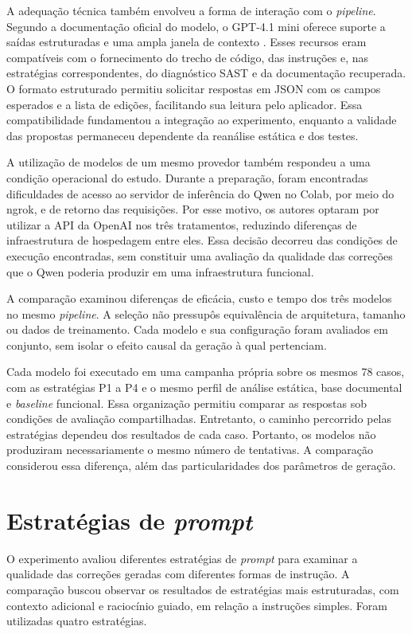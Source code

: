 A adequação técnica também envolveu a forma de interação com o \textit{pipeline}. Segundo a documentação oficial do modelo, o GPT-4.1 mini oferece suporte a saídas estruturadas e uma ampla janela de contexto \cite{openai_gpt41mini}. Esses recursos eram compatíveis com o fornecimento do trecho de código, das instruções e, nas estratégias correspondentes, do diagnóstico SAST e da documentação recuperada. O formato estruturado permitiu solicitar respostas em JSON com os campos esperados e a lista de edições, facilitando sua leitura pelo aplicador. Essa compatibilidade fundamentou a integração ao experimento, enquanto a validade das propostas permaneceu dependente da reanálise estática e dos testes.

A utilização de modelos de um mesmo provedor também respondeu a uma condição operacional do estudo. Durante a preparação, foram encontradas dificuldades de acesso ao servidor de inferência do Qwen no Colab, por meio do ngrok, e de retorno das requisições. Por esse motivo, os autores optaram por utilizar a API da OpenAI nos três tratamentos, reduzindo diferenças de infraestrutura de hospedagem entre eles. Essa decisão decorreu das condições de execução encontradas, sem constituir uma avaliação da qualidade das correções que o Qwen poderia produzir em uma infraestrutura funcional.

A comparação examinou diferenças de eficácia, custo e tempo dos três modelos no mesmo \textit{pipeline}. A seleção não pressupôs equivalência de arquitetura, tamanho ou dados de treinamento. Cada modelo e sua configuração foram avaliados em conjunto, sem isolar o efeito causal da geração à qual pertenciam.

Cada modelo foi executado em uma campanha própria sobre os mesmos 78 casos, com as estratégias P1 a P4 e o mesmo perfil de análise estática, base documental e \textit{baseline} funcional. Essa organização permitiu comparar as respostas sob condições de avaliação compartilhadas. Entretanto, o caminho percorrido pelas estratégias dependeu dos resultados de cada caso. Portanto, os modelos não produziram necessariamente o mesmo número de tentativas. A comparação considerou essa diferença, além das particularidades dos parâmetros de geração.

\section{Estratégias de \textit{prompt}}
\label{sec:met-prompts}

O experimento avaliou diferentes estratégias de \textit{prompt} para examinar a qualidade das correções geradas com diferentes formas de instrução. A comparação buscou observar os resultados de estratégias mais estruturadas, com contexto adicional e raciocínio guiado, em relação a instruções simples. Foram utilizadas quatro estratégias.

